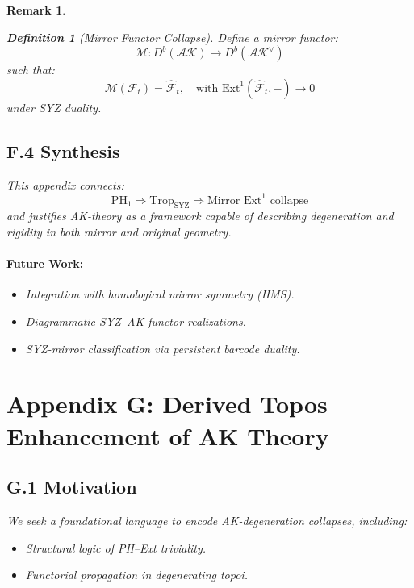 \documentclass[11pt]{article}
\newtheorem{definition}[theorem]{Definition}
\newtheorem{remark}[theorem]{Remark}
\begin{document}
\begin{remark}
\begin{definition}[Mirror Functor Collapse]
Define a mirror functor:
\[
\mathcal{M}: D^b(\mathcal{AK}) \to D^b(\mathcal{AK}^\vee)
\]
such that:
\[
\mathcal{M}(\mathcal{F}_t) = \widehat{\mathcal{F}}_t, \quad \text{with } \mathrm{Ext}^1(\widehat{\mathcal{F}}_t, -) \to 0
\]
under SYZ duality.
\end{definition}

\subsection*{F.4 Synthesis}

This appendix connects:
\[
\mathrm{PH}_1 \Rightarrow \mathrm{Trop}_{\mathrm{SYZ}} \Rightarrow \text{Mirror } \mathrm{Ext}^1 \text{ collapse}
\]
and justifies AK-theory as a framework capable of describing degeneration and rigidity in both mirror and original geometry.

\paragraph{Future Work:}
\begin{itemize}
  \item Integration with homological mirror symmetry (HMS).
  \item Diagrammatic SYZ–AK functor realizations.
  \item SYZ-mirror classification via persistent barcode duality.
\end{itemize}



\section*{Appendix G: Derived Topos Enhancement of AK Theory}

\subsection*{G.1 Motivation}
We seek a foundational language to encode AK-degeneration collapses, including:
\begin{itemize}
  \item Structural logic of PH–Ext triviality.
  \item Functorial propagation in degenerating topoi.
\end{itemize}


\end{remark}
\end{document}
